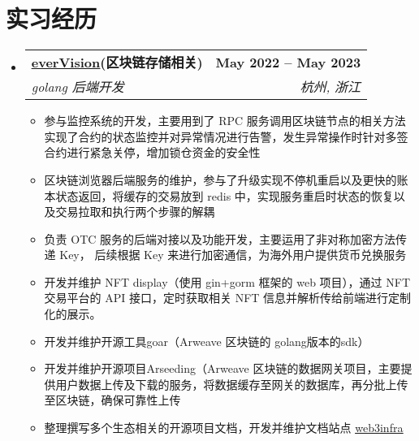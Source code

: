 \documentclass[letterpaper,11pt]{ctexart}
\makeatletter
\newcommand{\resumeItem}[1]{
  \item\small{
    {#1 \vspace{-2pt}}
  }
}
\newcommand{\resumeSubheading}[4]{
  \vspace{-2pt}\item
    \begin{tabular*}{1.0\textwidth}[t]{l@{\extracolsep{\fill}}r}
      \textbf{#1} & \textbf{\small #2} \\
      \textit{\small#3} & \textit{\small #4} \\
    \end{tabular*}\vspace{-7pt}
}
\newcommand{\resumeSubHeadingListStart}{\begin{itemize}[leftmargin=0.0in, label={}]}
\newcommand{\resumeSubHeadingListEnd}{\end{itemize}}
\newcommand{\resumeItemListStart}{\begin{itemize}}
\newcommand{\resumeItemListEnd}{\end{itemize}\vspace{-5pt}}
\makeatother
\begin{document}
\section{实习经历}
  \resumeSubHeadingListStart

    \resumeSubheading
      {\href{https://www.ever.finance}{\underline{everVision}}(区块链存储相关)}{May 2022 -- May 2023}
      {golang 后端开发}{杭州, 浙江}
      \resumeItemListStart
        \resumeItem{参与监控系统的开发，主要用到了 RPC 服务调用区块链节点的相关方法实现了合约的状态监控并对异常情况进行告警，发生异常操作时针对多签合约进行紧急关停，增加锁仓资金的安全性}
        \resumeItem{区块链浏览器后端服务的维护，参与了升级实现不停机重启以及更快的账本状态返回，将缓存的交易放到 redis 中，实现服务重启时状态的恢复以及交易拉取和执行两个步骤的解耦}
        \resumeItem{负责 OTC 服务的后端对接以及功能开发，主要运用了非对称加密方法传递 Key， 后续根据 Key 来进行加密通信，为海外用户提供货币兑换服务}
        \resumeItem{开发并维护 NFT display（使用 gin+gorm 框架的 web 项目），通过 NFT 交易平台的 API 接口，定时获取相关 NFT 信息并解析传给前端进行定制化的展示。}
        \resumeItem{开发并维护开源工具goar（Arweave 区块链的 golang版本的sdk）}
        \resumeItem{开发并维护开源项目Arseeding（Arweave 区块链的数据网关项目，主要提供用户数据上传及下载的服务，将数据缓存至网关的数据库，再分批上传至区块链，确保可靠性上传}
        \resumeItem{整理撰写多个生态相关的开源项目文档，开发并维护文档站点 \href{https://web3infra.dev/}{\underline{web3infra}}}
      \resumeItemListEnd

    
  \resumeSubHeadingListEnd
\vspace{-16pt}

\end{document}
